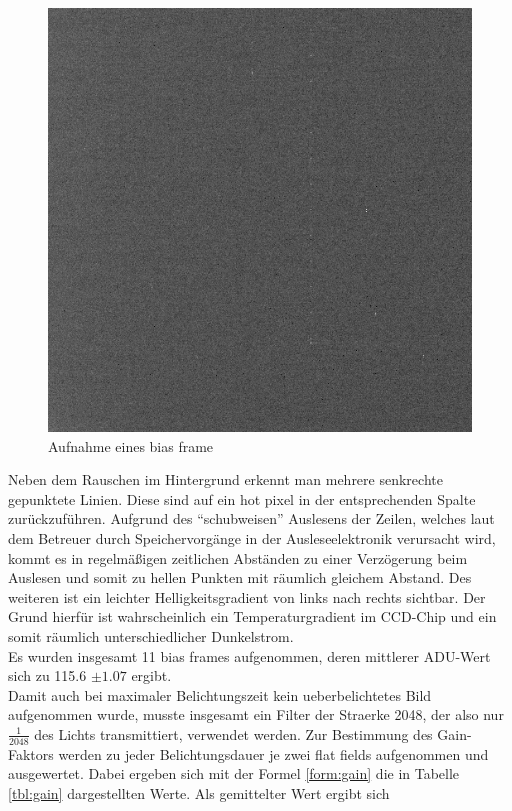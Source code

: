 \begin{figure}[h!]
\centering
        \includegraphics[width=.9\textwidth]{beiers_01.png}
\caption{ Aufnahme eines bias frame }
\label{fig:bias}
\end{figure}
Neben dem Rauschen im Hintergrund erkennt man mehrere senkrechte gepunktete Linien. Diese sind auf ein hot pixel in der entsprechenden Spalte zurückzuführen. Aufgrund des \enquote{schubweisen} Auslesens der Zeilen, welches  laut dem Betreuer durch Speichervorgänge in der Ausleseelektronik verursacht wird, kommt es in regelmäßigen zeitlichen Abständen zu einer Verzögerung beim Auslesen und somit zu hellen Punkten mit räumlich gleichem Abstand. Des weiteren ist ein leichter Helligkeitsgradient von links nach rechts sichtbar. Der Grund hierfür ist wahrscheinlich ein Temperaturgradient im CCD-Chip und ein somit räumlich unterschiedlicher Dunkelstrom. \\
Es wurden insgesamt 11 bias frames aufgenommen, deren mittlerer ADU-Wert sich zu 115.6 $ \pm 1.07$ ergibt. \\
Damit auch bei maximaler Belichtungszeit kein ueberbelichtetes Bild aufgenommen wurde, musste insgesamt ein Filter der Straerke 2048, der also nur $\frac{1}{2048}$ des Lichts transmittiert, verwendet werden. 
Zur Bestimmung des Gain-Faktors werden zu jeder Belichtungsdauer je zwei flat fields aufgenommen und ausgewertet. Dabei ergeben sich mit der Formel \eqref{form:gain} die in Tabelle \ref{tbl:gain} dargestellten Werte. Als gemittelter Wert ergibt sich 
